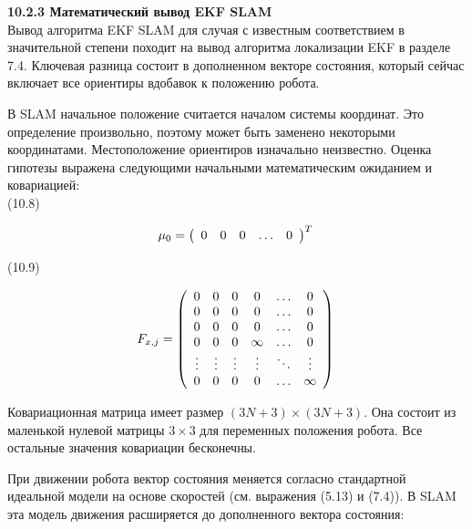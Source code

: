 \documentclass[10pt,a4paper]{article}
\begin{document}
\textbf{10.2.3 Математический вывод EKF SLAM}\\

Вывод алгоритма EKF SLAM для случая с известным соответствием в значительной степени походит на вывод алгоритма локализации EKF в разделе 7.4. Ключевая разница состоит в дополненном векторе состояния, который сейчас включает все ориентиры вдобавок к положению робота.

В SLAM начальное положение считается началом системы координат. Это определение произвольно, поэтому может быть заменено некоторыми координатами. Местоположение ориентиров изначально неизвестно. Оценка гипотезы выражена следующими начальными математическим ожиданием и ковариацией:\\

(10.8)
\begin{minipage}{0.2\textwidth}
\begin{equation*}
\mu_0=\left(\begin{array}{ccccc}0&0&0&\ldots&0 
\end{array} \right)^T\\
\end{equation*}
\end{minipage}

(10.9)
\begin{minipage}{0.2\textwidth}
\begin{equation*}
F_{x,j}=\left(\begin{array}{cccccc} 
0&0&0&0&\ldots&0\\
0&0&0&0&\ldots&0\\
0&0&0&0&\ldots&0\\
0&0&0&\infty&\ldots&0\\
\vdots&\vdots&\vdots&\vdots&\ddots&\vdots\\
0&0&0&0&\ldots&\infty\\
\end{array} \right)\\
\end{equation*}
\end{minipage}

Ковариационная матрица имеет размер $(3N + 3)\times(3N + 3)$. Она состоит из маленькой нулевой матрицы $3\times3$ для переменных положения робота. Все остальные значения ковариации бесконечны.

При движении робота вектор состояния меняется согласно стандартной идеальной модели на основе скоростей (см. выражения (5.13) и (7.4)). В SLAM эта модель движения расширяется до дополненного вектора состояния:\\
\end{document}
